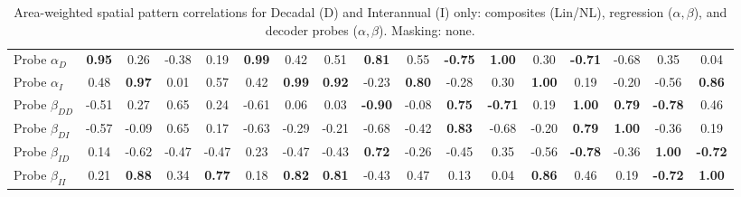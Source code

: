 \begin{table}[t]
\begin{tabular}{lcccccccccccccccc}
Probe $\alpha_{D}$ & \textbf{0.95} & 0.26 & -0.38 & 0.19 & \textbf{0.99} & 0.42 & 0.51 & \textbf{0.81} & 0.55 & \textbf{-0.75} & \textbf{1.00} & 0.30 & \textbf{-0.71} & -0.68 & 0.35 & 0.04 \\
Probe $\alpha_{I}$ & 0.48 & \textbf{0.97} & 0.01 & 0.57 & 0.42 & \textbf{0.99} & \textbf{0.92} & -0.23 & \textbf{0.80} & -0.28 & 0.30 & \textbf{1.00} & 0.19 & -0.20 & -0.56 & \textbf{0.86} \\
Probe $\beta_{DD}$ & -0.51 & 0.27 & 0.65 & 0.24 & -0.61 & 0.06 & 0.03 & \textbf{-0.90} & -0.08 & \textbf{0.75} & \textbf{-0.71} & 0.19 & \textbf{1.00} & \textbf{0.79} & \textbf{-0.78} & 0.46 \\
Probe $\beta_{DI}$ & -0.57 & -0.09 & 0.65 & 0.17 & -0.63 & -0.29 & -0.21 & -0.68 & -0.42 & \textbf{0.83} & -0.68 & -0.20 & \textbf{0.79} & \textbf{1.00} & -0.36 & 0.19 \\
Probe $\beta_{ID}$ & 0.14 & -0.62 & -0.47 & -0.47 & 0.23 & -0.47 & -0.43 & \textbf{0.72} & -0.26 & -0.45 & 0.35 & -0.56 & \textbf{-0.78} & -0.36 & \textbf{1.00} & \textbf{-0.72} \\
Probe $\beta_{II}$ & 0.21 & \textbf{0.88} & 0.34 & \textbf{0.77} & 0.18 & \textbf{0.82} & \textbf{0.81} & -0.43 & 0.47 & 0.13 & 0.04 & \textbf{0.86} & 0.46 & 0.19 & \textbf{-0.72} & \textbf{1.00} \\
\bottomrule
\end{tabular}
\caption{Area-weighted spatial pattern correlations for Decadal (D) and Interannual (I) only: composites (Lin/NL), regression ($\alpha,\beta$), and decoder probes ($\alpha,\beta$). Masking: none.}
\label{tab:corr_DI_only_none}
\end{table}
